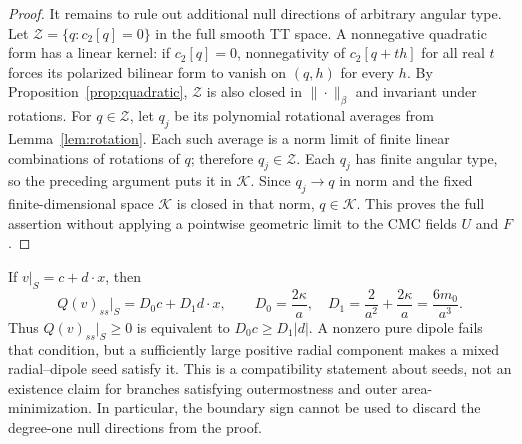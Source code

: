 \begin{proof}
It remains to rule out additional null directions of arbitrary angular
type.  Let $\mathcal Z=\{q:c_2[q]=0\}$ in the full smooth TT space.
A nonnegative quadratic form has a linear kernel: if $c_2[q]=0$,
nonnegativity of $c_2[q+th]$ for all real $t$ forces its polarized
bilinear form to vanish on $(q,h)$ for every $h$.
By Proposition~\ref{prop:quadratic}, $\mathcal Z$ is also closed in
$\|\cdot\|_\beta$ and invariant under rotations.
For $q\in\mathcal Z$, let $q_j$ be its polynomial rotational averages
from Lemma~\ref{lem:rotation}.  Each such average is a norm limit of
finite linear combinations of rotations of $q$; therefore
$q_j\in\mathcal Z$.  Each $q_j$ has finite angular type, so the
preceding argument puts it in $\mathcal K$.
Since $q_j\to q$ in norm and the fixed finite-dimensional space
$\mathcal K$ is closed in that norm, $q\in\mathcal K$.
This proves the full assertion without applying a pointwise geometric
limit to the CMC fields $U$ and $F$.
\end{proof}

\begin{remark}
\label{rem:kernel-sign}
If $v|_S=c+d\cdot x$, then
\[
 Q(v)_{ss}|_S=D_0c+D_1d\cdot x,
 \qquad D_0=\frac{2\kappa}{a},\quad
 D_1=\frac2{a^2}+\frac{2\kappa}{a}=\frac{6m_0}{a^3}.
\]
Thus $Q(v)_{ss}|_S\geq0$ is equivalent to $D_0c\geq D_1|d|$.
A nonzero pure dipole fails that condition, but a sufficiently large
positive radial component makes a mixed radial--dipole seed satisfy
it.  This is a compatibility statement about seeds, not an existence
claim for branches satisfying outermostness and outer
area-minimization.  In particular, the boundary sign cannot be used
to discard the degree-one null directions from the proof.
\end{remark}
